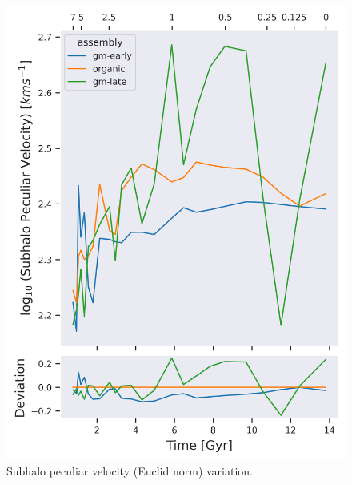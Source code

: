 \documentclass[twocolumn]{article}
\begin{document}
	\begin{figure}
			\centering 
			\includegraphics[width=\columnwidth]{./subhalo_peculiar_velocity.png}
			\caption{Subhalo peculiar velocity (Euclid norm) variation.}
	\end{figure}
\end{document}
